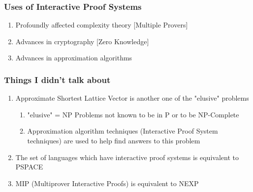 \documentclass{beamer}
\begin{document}
\begin{frame}
\frametitle{Uses of Interactive Proof Systems}
\pause
\begin{enumerate}
\item Profoundly affected complexity theory [Multiple Provers]
\pause
\item Advances in cryptography [Zero Knowledge]
\pause
\item Advances in approximation algorithms

\end{enumerate}
\end{frame}

\begin{frame}
\frametitle{Things I didn't talk about}
\begin{enumerate}
\item Approximate Shortest Lattice Vector is another one of the "elusive" problems
\begin{enumerate}
\item "elusive" = NP Problems not known to be in P or to be NP-Complete
\item Approximation algorithm techniques (Interactive Proof System techniques) are used to help find answers to this problem
\end{enumerate}
\item The set of languages which have interactive proof systems is equivalent to PSPACE
\item MIP (Multiprover Interactive Proofs) is equivalent to NEXP
\end{enumerate}
\end{frame}
\end{document}
